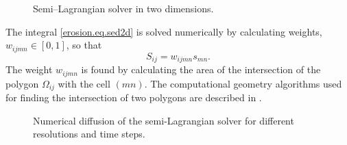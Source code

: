 \begin{figure}[htbp]
  \centering
  
  \caption{Semi--Lagrangian solver in two dimensions.}
  \label{erosion.fig.lag2d}
\end{figure}

The integral \eqref{erosion.eq.sed2d} is solved numerically by calculating weights, $w_{ijmn}\in[0,1]$, so that
\begin{equation}
  S_{ij}=w_{ijmn}s_{mn}.
\end{equation}
The weight $w_{ijmn}$ is found by calculating the area of the intersection of the polygon $\Omega_{ij}$ with the cell $(mn)$. The computational geometry algorithms used for finding the intersection of two polygons are described in \citet{O'Rourke1998}. 

\begin{figure}[htbp]
  \centering
  \caption{Numerical diffusion of the semi-Lagrangian solver for different resolutions and time steps.}
  \label{erosion.fig.art_diffu}
\end{figure}
